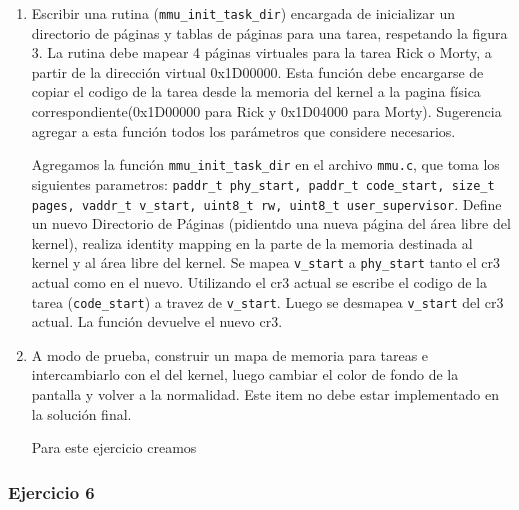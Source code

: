 \documentclass[a4paper]{article}
\begin{document}
\begin{enumerate}[label=\alph*)]
\begin{enumerate}[label=\Roman{*}-]
 	\end{enumerate}
 	
 	\item Escribir una rutina (\texttt{mmu\_init\_task\_dir}) encargada de inicializar un directorio de páginas y tablas de páginas para una tarea, respetando la figura 3. La rutina debe mapear 4 p\'aginas virtuales para la tarea Rick o Morty, a partir de la dirección virtual 0x1D00000. Esta función debe encargarse de copiar el codigo de la tarea desde la memoria del kernel a la pagina física correspondiente(0x1D00000 para Rick y 0x1D04000 para Morty). Sugerencia agregar a esta función todos los parámetros que considere necesarios.
 	
 	Agregamos la función \texttt{mmu\_init\_task\_dir} en el archivo \texttt{mmu.c}, que toma los siguientes parametros: \texttt{paddr\_t phy\_start, paddr\_t code\_start, size\_t pages, vaddr\_t v\_start, uint8\_t rw, uint8\_t user\_supervisor}. 
	Define un nuevo Directorio de P\'aginas (pidientdo una nueva p\'agina del \'area libre del kernel), realiza identity mapping en la parte de la memoria destinada al kernel y al \'area libre del kernel. Se mapea \texttt{v\_start} a \texttt{phy\_start} tanto el cr3 actual como en el nuevo. Utilizando el cr3 actual  se escribe el codigo de la tarea (\texttt{code\_start}) a travez de \texttt{v\_start}. Luego se desmapea \texttt{v\_start} del cr3 actual. La función devuelve el nuevo cr3.
	
	\item A modo de prueba, construir un mapa de memoria para tareas e intercambiarlo con el del kernel, luego cambiar el color de fondo de la pantalla y volver a la normalidad. Este item no debe estar implementado en la soluci\'on final.
 	
 	Para este ejercicio creamos 
 	
 \end{enumerate}
 

 \subsubsection{Ejercicio 6}
 
\end{document}
